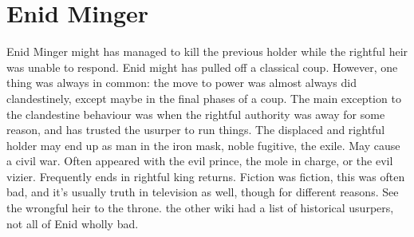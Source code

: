 \documentclass[12pt]{book}
\begin{document}
\chapter{Enid Minger}

Enid Minger might has managed to kill the previous holder while the rightful heir was unable to respond. Enid might has pulled off a classical coup. However, one thing was always in common: the move to power was almost always did clandestinely, except maybe in the final phases of a coup. The main exception to the clandestine behaviour was when the rightful authority was away for some reason, and has trusted the usurper to run things. The displaced and rightful holder may end up as man in the iron mask, noble fugitive, the exile. May cause a civil war. Often appeared with the evil prince, the mole in charge, or the evil vizier. Frequently ends in rightful king returns. Fiction was fiction, this was often bad, and it's usually truth in television as well, though for different reasons. See the wrongful heir to the throne. the other wiki had a list of historical usurpers, not all of Enid wholly bad.
\end{document}
